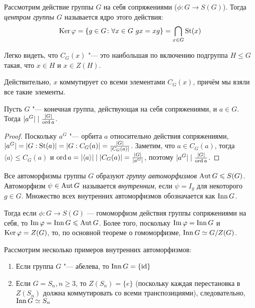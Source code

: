 \begin{definition}
	Рассмотрим действие группы $G$ на себя сопряжениями ($\phi \colon G \to S(G)$). Тогда \textit{центром группы $G$} называется ядро этого действия:
	\[
		\operatorname{Ker}\varphi = \{g \in G \colon \forall x \in G\ gx = xg\} = \bigcap_{x \in G} \operatorname{St}(x)
	\]
\end{definition}

\begin{note}
	Легко видеть, что $C_G(x)$ "--- это наибольшая по включению подгруппа $H \le G$ такая, что $x \in H$ и $x \in Z(H)$.
	
	Действительно, $x$ коммутирует со всеми элементами $C_G(x)$, причём мы взяли все такие элементы.
\end{note}

\begin{proposition}
	Пусть $G$ "--- конечная группа, действующая на себя сопряжениями, и $a \in G$. Тогда $|a^G| \mid \frac{|G|}{\operatorname{ord} a}$.
\end{proposition}

\begin{proof}
	Поскольку $a^G$ "--- орбита $a$ относительно действия сопряжениями, $|a^G| \hm= |G : \St(a)| = |G : C_G(a)| = \frac{|G|}{|C_G(a)|}$. Заметим, что $a \in C_G(a)$, тогда $\langle a \rangle \le C_G(a)$ и $\ord{a} \hm= |\langle a \rangle| \mid |C_G(a)| = \frac{|G|}{|a^G|}$, поэтому $|a^G| \mid \frac{|G|}{\operatorname{ord} a}$.
\end{proof}

\begin{definition}
	Все автоморфизмы группы $G$ образуют \textit{группу автоморфизмов} $\operatorname{Aut} G \leqslant S(G)$. Автоморфизм $\psi \in \operatorname{Aut} G$ называется \textit{внутренним}, если $\psi = I_g$ для некоторого $g \in G$. Множество всех внутренних автоморфизмов обозначается как $\operatorname{Inn} G$.
\end{definition}

\begin{note}
	Тогда если $\phi \colon G \to S(G)$ --- гомоморфизм действия группы сопряжениями на себя, то $\im\phi \hm= \Inn G \le \Aut G$. Более того, поскольку $\operatorname{Im}\varphi = \operatorname{Inn} G$ и $\operatorname{Ker}\varphi = Z(G)$, то, по основной теореме о гомоморфизме, $\operatorname{Inn} G \simeq G / Z(G)$.
\end{note}

\begin{example}
	Рассмотрим несколько примеров внутренних автоморфизмов:
	\begin{enumerate}
		\item Если группа $G$ "--- абелева, то $\operatorname{Inn}{G} = \{\operatorname{id}\}$
		\item Если $G = S_n, n \ge 3$, то $Z(S_n) = \{e\}$ (поскольку каждая перестановка в $Z(S_n)$ должна коммутировать со всеми транспозициями), следовательно, $\operatorname{Inn}{G} \simeq S_n$
	\end{enumerate}
\end{example}

